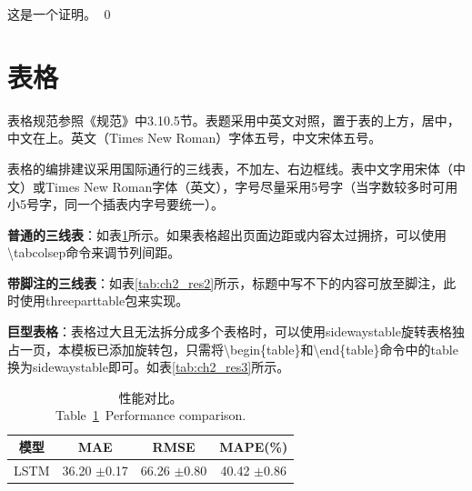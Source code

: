 \begin{Proof}
	这是一个证明。
	\qed
\end{Proof}

\section{表格}

表格规范参照《规范》中3.10.5节。表题采用中英文对照，置于表的上方，居中，中文在上。英文（Times New Roman）字体五号，中文宋体五号。 

表格的编排建议采用国际通行的三线表，不加左、右边框线。表中文字用宋体（中文）或Times New Roman字体（英文），字号尽量采用5号字（当字数较多时可用小5号字，同一个插表内字号要统一）。

\textbf{普通的三线表}：如表\ref{tab:ch2_res1}所示。如果表格超出页面边距或内容太过拥挤，可以使用\textbackslash tabcolsep命令来调节列间距。

\textbf{带脚注的三线表}：如表\ref{tab:ch2_res2}所示，标题中写不下的内容可放至脚注，此时使用threeparttable包来实现。

\textbf{巨型表格}：表格过大且无法拆分成多个表格时，可以使用sidewaystable旋转表格独占一页，本模板已添加旋转包，只需将\textbackslash begin\{table\}和\textbackslash end\{table\}命令中的table换为sidewaystable即可。如表\ref{tab:ch2_res3}所示。

%		

\begin{table}[!htb]
	\centering
	\small %
	\setlength\tabcolsep{10pt} %
	\caption{性能对比。\\Table~\ref{tab:ch2_res1}~Performance comparison. }
	\begin{tabular}{c|ccc}
		\toprule
		模型 & MAE & RMSE & MAPE(\%)  \\
		\midrule
		LSTM & 36.20 $\pm$0.17 & 66.26 $\pm$0.80 & 40.42 $\pm$0.86 \\
		\bottomrule
	\end{tabular}
	\label{tab:ch2_res1}
\end{table}

